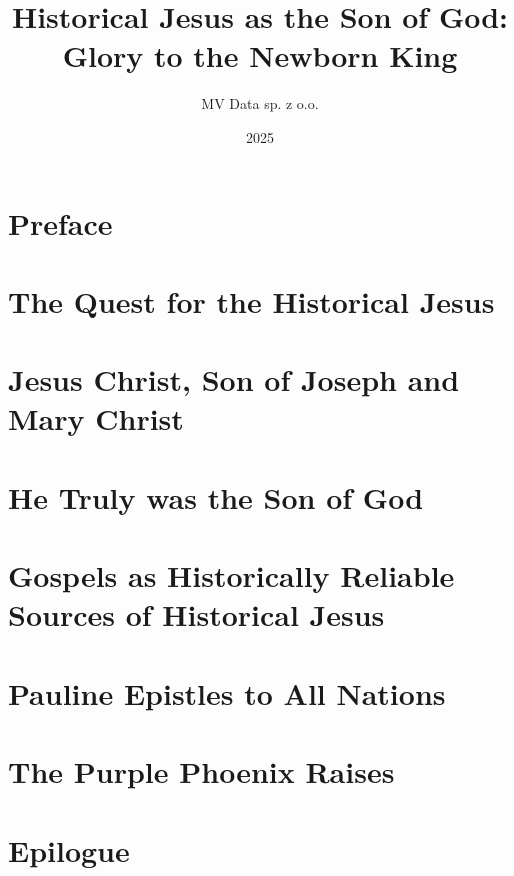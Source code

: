 \documentclass[12pt]{book}
\title{Historical Jesus as the Son of God: Glory to the Newborn King}
\author{MV Data sp. z o.o.}
\date{2025}
\begin{document}
\maketitle

\tableofcontents

\chapter*{Preface}


\chapter{The Quest for the Historical Jesus}\label{ch:the-quest-for-the-historical-jesus}


\chapter{Jesus Christ, Son of Joseph and Mary Christ}\label{ch:jesus-christ-son-of-joseph-and-mary-christ}


\chapter{He Truly was the Son of God}\label{ch:he-truly-was-the-son-of-god}


\chapter{Gospels as Historically Reliable Sources of Historical Jesus}\label{ch:gospels-are-historically-reliable}


\chapter{Pauline Epistles to All Nations}\label{ch:pauline-epistles-to-all-nations}


\chapter{The Purple Phoenix Raises}\label{ch:the-purple-phoenix-raises}


\chapter*{Epilogue}


\backmatter
\nocite{*}
\printbibliography[keyword=ancient,title={Ancient Primary Sources}]
\printbibliography[keyword=patristic,title={Church Fathers and Early Christian Literature}]
\printbibliography[keyword=modern,title={Modern Scholarship}]
\end{document}
